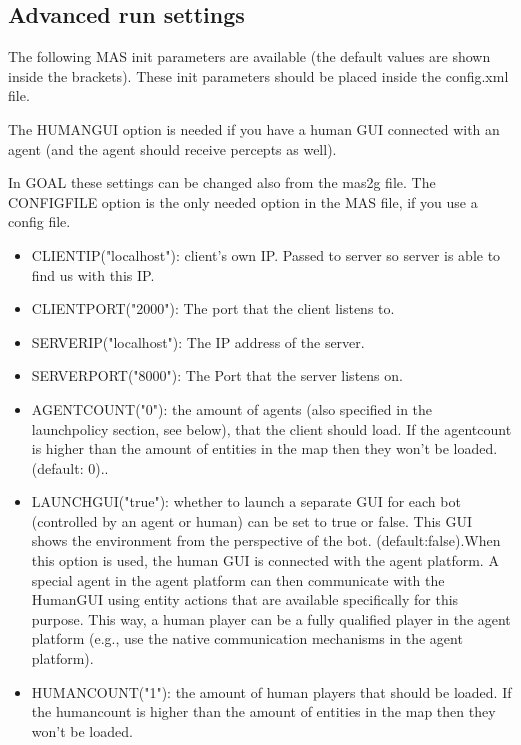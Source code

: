 \documentclass[11pt,a4paper]{article}
\begin{document}
\subsection{Advanced run settings}
The following MAS init parameters are available (the default values are shown inside the brackets). These init parameters should be placed inside the config.xml file. 

The HUMANGUI option is needed if you have a human GUI connected with an agent (and the agent should receive percepts as well).

In GOAL these settings can be changed also from the mas2g file. The CONFIGFILE option is the only needed option in the MAS file, if you use a config file.  

\begin{itemize}
\item

    CLIENTIP("localhost"):    client's own IP. Passed to server so server is able to find us with this IP. 

\item
    CLIENTPORT("2000"):   The port that the client listens to. 


\item
    SERVERIP("localhost"):
 The IP address of the server. 
  
\item
    SERVERPORT("8000"):
   The Port that the server listens on. 

\item
    AGENTCOUNT("0"):
 the amount of agents (also specified in the launchpolicy section, see below), that the client should load. If the agentcount is higher than the amount of entities in the map then they won't be loaded. (default: 0).. 
    
\item
    LAUNCHGUI("true"):
    whether to launch a separate GUI for each bot (controlled by an agent or human) can be set to true or false. This GUI shows the environment from the perspective of the bot. (default:false).When this option is used, the human GUI is connected with the agent platform. A special agent in the agent platform can then communicate with the HumanGUI using entity actions that are available specifically for this purpose. This way, a human player can be a fully qualified player in the agent platform (e.g., use the native communication mechanisms in the agent platform).


\item
    HUMANCOUNT("1"):
    the amount of human players that should be loaded. If the humancount is higher than the amount of entities in the map then they won't be loaded. 


\end{itemize}
\end{document}
